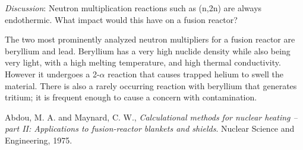 \documentclass[11pt]{report} %
\begin{document}
{\it Discussion}: Neutron multiplication reactions such as (n,2n) are always endothermic. What impact would this have on a fusion reactor?

The two most prominently analyzed neutron multipliers for a fusion reactor are beryllium and lead. Beryllium has a very high nuclide density while also being very light, with a high melting temperature, and high thermal conductivity. However it undergoes a 2-$\alpha$ reaction that causes trapped helium to swell the material. There is also a rarely occurring reaction with beryllium that generates tritium; it is frequent enough to cause a concern with contamination.

\begin{thebibliography}{9}

  Abdou, M. A. and Maynard, C. W.,
  \emph{Calculational methods for nuclear heating -- part II: Applications to fusion-reactor blankets and shields}.
  Nuclear Science and Engineering,
  1975.

\end{thebibliography}
\end{document}
